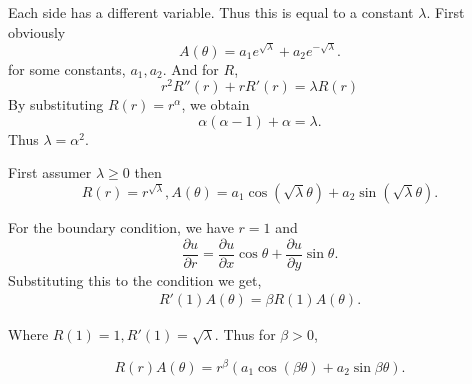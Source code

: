 \documentclass{article}
\begin{document}
Each side has a different variable. Thus this is equal to a constant $\lambda$. First obviously
\begin{equation*}
A(\theta) = a_1e^{\sqrt{\lambda}}+a_2e^{-\sqrt{\lambda}}.
\end{equation*}
for some constants, $a_1,a_2$. And for $R$,
\begin{equation*}
r^2R''(r)+rR'(r) =\lambda R(r)
\end{equation*}
By substituting $R(r) = r^\alpha$, we obtain
\begin{equation*}
\alpha(\alpha-1)+\alpha = \lambda.
\end{equation*}
Thus $\lambda = \alpha^2$.

First assumer $\lambda \geq 0$ then 
\begin{equation*}
R(r) = r^{\sqrt{\lambda}}, A(\theta) = a_1\cos(\sqrt{\lambda}\theta)+a_2\sin(\sqrt{\lambda}\theta).
\end{equation*}

For the boundary condition, we have $r=1$ and 
\begin{equation*}
{\frac {\partial u} {\partial r}} = {\frac {\partial u} {\partial x}}\cos\theta+{\frac {\partial u} {\partial y}}\sin\theta.
\end{equation*}
Substituting this to the condition we get,
\begin{align*}
R'(1)A(\theta) = \beta R(1)A(\theta).
\end{align*}

Where $R(1) = 1,R'(1) = \sqrt{\lambda}$. Thus for $\beta>0$,

\begin{equation*}
R(r)A(\theta) = r^{\beta}(a_1\cos(\beta\theta)+a_2\sin\beta\theta).
\end{equation*}
\end{document}
